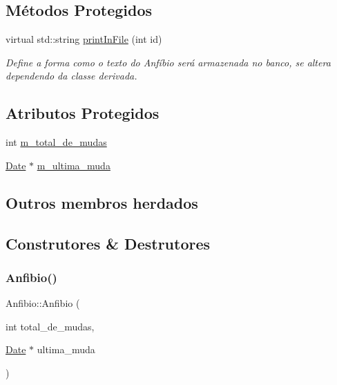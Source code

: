 \subsection*{Métodos Protegidos}
\begin{DoxyCompactItemize}
\item 
virtual std\+::string \hyperlink{classAnfibio_a46f3f30c89af05bcdd39abbe692d854f}{print\+In\+File} (int id)
\begin{DoxyCompactList}\small\item\em Define a forma como o texto do Anfíbio será armazenada no banco, se altera dependendo da classe derivada. \end{DoxyCompactList}\end{DoxyCompactItemize}
\subsection*{Atributos Protegidos}
\begin{DoxyCompactItemize}
\item 
int \hyperlink{classAnfibio_a994200134b0d314e3db0ac5c781bb7e7}{m\+\_\+total\+\_\+de\+\_\+mudas}
\item 
\hyperlink{classDate}{Date} $\ast$ \hyperlink{classAnfibio_abc4969388066028d800dd134d3fc3ae9}{m\+\_\+ultima\+\_\+muda}
\end{DoxyCompactItemize}
\subsection*{Outros membros herdados}


\subsection{Construtores \& Destrutores}
\mbox{\label{classAnfibio_a488a2d9bfe450ebd8f0a19c5ec4eea32}} 
\subsubsection{\texorpdfstring{Anfibio()}{Anfibio()}\hspace{0.1cm}{\footnotesize\ttfamily [1/2]}}
{\footnotesize\ttfamily Anfibio\+::\+Anfibio (\begin{DoxyParamCaption}\item[{int}]{total\+\_\+de\+\_\+mudas,  }\item[{\hyperlink{classDate}{Date} $\ast$}]{ultima\+\_\+muda }\end{DoxyParamCaption})}



